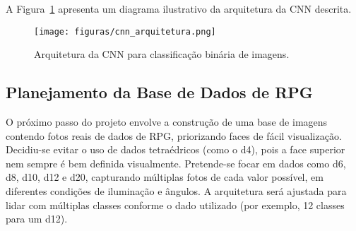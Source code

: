 A Figura~\ref{fig:modelo-cnn} apresenta um diagrama ilustrativo da arquitetura da CNN descrita.

\begin{figure}[H]
    \centering
    \texttt{[image: figuras/cnn\_arquitetura.png]}
    \caption{Arquitetura da CNN para classificação binária de imagens.}
    \label{fig:modelo-cnn}
\end{figure}

\subsection{Planejamento da Base de Dados de RPG}

O próximo passo do projeto envolve a construção de uma base de imagens contendo fotos reais de dados de RPG, priorizando faces de fácil visualização. Decidiu-se evitar o uso de dados tetraédricos (como o d4), pois a face superior nem sempre é bem definida visualmente. Pretende-se focar em dados como d6, d8, d10, d12 e d20, capturando múltiplas fotos de cada valor possível, em diferentes condições de iluminação e ângulos. A arquitetura será ajustada para lidar com múltiplas classes conforme o dado utilizado (por exemplo, 12 classes para um d12).

